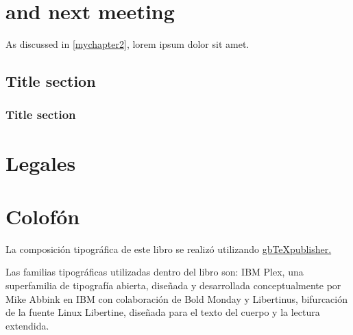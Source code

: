 \documentclass{book}
\begin{document}
\lipsum[1]

\chapter{and next meeting}
As discussed in \ref{mychapter2}, lorem ipsum dolor sit amet.

\lipsum[2]

\section{Title section}

\lipsum[3]

\subsection{Title section}

\lipsum[1]

\backmatter

\ForceHTMLPage
\printnoidxglossary[title={Índice de siglas},type=\acronymtype]

\ForceHTMLPage
\printnoidxglossary[title={Glosario de términos}]

\ForceHTMLPage
\printbibliography[heading=bibintoc]

\chapter{Legales}

\lipsum[4]

\chapter{Colofón}

La composición tipográfica de este libro se realizó utilizando \href{https://github.com/albertomoyano/gbtexpublisher}{gbTeXpublisher.}

Las familias tipográficas utilizadas dentro del libro son: IBM Plex, una superfamilia de tipografía abierta, diseñada y desarrollada conceptualmente por Mike Abbink en IBM con colaboración de Bold Monday y Libertinus, bifurcación de la fuente Linux Libertine, diseñada para el texto del cuerpo y la lectura extendida.
\end{document}
